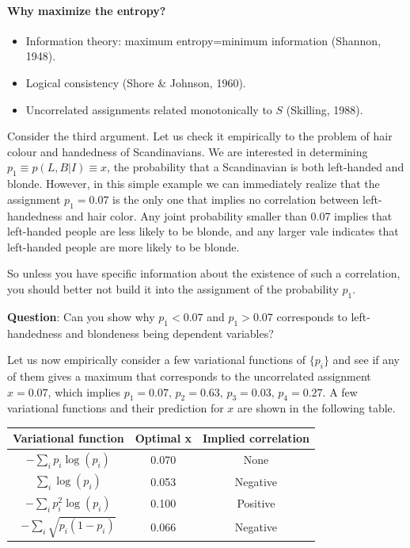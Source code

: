 \documentclass[%
oneside,                 %
final,                   %
10pt]{article}
\begin{document}
\paragraph{Why maximize the entropy?}
\begin{itemize}
\item Information theory: maximum entropy=minimum information (Shannon, 1948).

\item Logical consistency (Shore {\&} Johnson, 1960).

\item Uncorrelated assignments related monotonically to $S$ (Skilling, 1988).
\end{itemize}

\noindent
Consider the third argument. Let us check it empirically to the problem of hair colour and handedness of Scandinavians. We are interested in determining $p_1 \equiv p(L,B|I) \equiv x$, the probability that a Scandinavian is both left-handed and blonde. However, in this simple example we can immediately realize that the assignment $p_1=0.07$ is the only one that implies no correlation between left-handedness and hair color. Any joint probability smaller than 0.07 implies that left-handed people are less likely to be blonde, and any larger vale indicates that left-handed people are more likely to be blonde.

So unless you have specific information about the existence of such a correlation, you should better not build it into the assignment of the probability $p_1$. 

\textbf{Question}: Can you show why $p_1 < 0.07$ and $p_1 > 0.07$ corresponds to left-handedness and blondeness being dependent variables?

Let us now empirically consider a few variational functions of $\{ p_i \}$ and see if any of them gives a maximum that corresponds to the uncorrelated assignment $x=0.07$, which implies $p_1 = 0.07, \, p_2 = 0.63, \, p_3 = 0.03, \, p_4 = 0.27$. A few variational functions and their prediction for $x$ are shown in the following table.


\vspace{3mm}





\begin{tabular}{ccc}
\hline
\multicolumn{1}{c}{ Variational function } & \multicolumn{1}{c}{ Optimal x } & \multicolumn{1}{c}{ Implied correlation } \\
\hline
$-\sum_i p_i \log(p_i)$     & 0.070     & None                \\
$\sum_i \log(p_i)$          & 0.053     & Negative            \\
$-\sum_i p_i^2 \log(p_i)$   & 0.100     & Positive            \\
$-\sum_i \sqrt{p_i(1-p_i)}$ & 0.066     & Negative            \\
\hline
\end{tabular}
\end{document}
